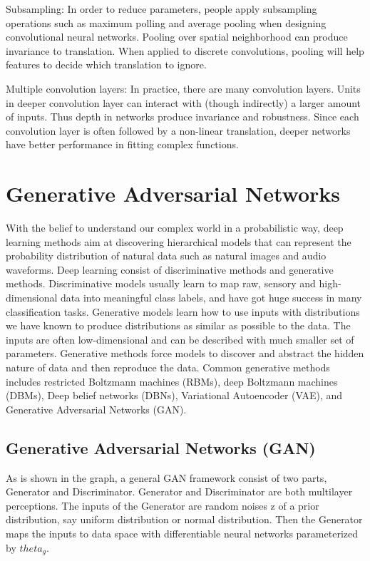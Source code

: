 Subsampling: In order to reduce parameters, people apply subsampling operations such as maximum polling and average pooling when designing convolutional neural networks. Pooling over spatial neighborhood can produce invariance to translation. When applied to discrete convolutions, pooling will help features to decide which translation to ignore.

Multiple convolution layers: In practice, there are many convolution layers. Units in deeper convolution layer can interact with (though indirectly) a larger amount of inputs. Thus depth in networks produce invariance and robustness. Since each convolution layer is often followed by a non-linear translation, deeper networks have better performance in fitting complex functions.


\section{Generative Adversarial Networks}

With the belief to understand our complex world in a probabilistic way, deep learning methods aim at discovering hierarchical models that can represent the probability distribution of natural data such as natural images and audio waveforms. Deep learning consist of discriminative methods and generative methods. Discriminative models usually learn to map raw, sensory and high-dimensional data into meaningful class labels, and have got huge success in many classification tasks. Generative models learn how to use inputs with distributions we have known to produce distributions as similar as possible to the data. The inputs are often low-dimensional and can be described with much smaller set of parameters. Generative methods force models to discover and abstract the hidden nature of data and then reproduce the data. Common generative methods includes restricted Boltzmann machines (RBMs), deep Boltzmann machines (DBMs), Deep belief networks (DBNs), Variational Autoencoder (VAE), and Generative Adversarial Networks (GAN).

\subsection{Generative Adversarial Networks (GAN)}
As is shown in the graph, a general GAN framework consist of two parts, Generator and Discriminator. Generator and Discriminator are both multilayer perceptions. The inputs of the Generator are random noises z of a prior distribution, say uniform distribution or normal distribution. Then the Generator maps the inputs to data space with differentiable neural networks parameterized by $theta_g$.

